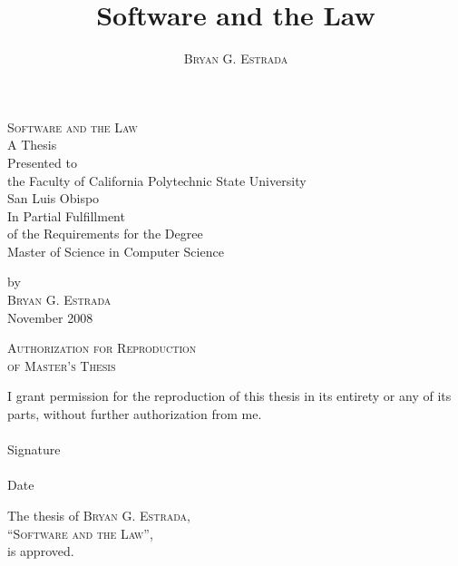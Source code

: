 \documentclass[12pt]{report}
\newcommand{\thetitle}{Software and the Law}
\newcommand{\theauthor}{\textsc{Bryan G. Estrada}}
\newcommand{\theuniversity}{California Polytechnic State University}
\newcommand{\thecity}{San Luis Obispo}
\newcommand{\thedegree}{Master of Science in Computer Science}
\newcommand{\thedate}{November 2008}
\begin{document}
 

\title{\thetitle} 
\author{\theauthor} 

\doublespace 


\begin{titlepage} 
\thispagestyle{empty} 
\begin{center} 

\textsc{\LARGE \thetitle}\\[4cm] 

A Thesis\\ 
Presented to\\ 
the Faculty of \theuniversity\\ 
\thecity\\[4cm] 

In Partial Fulfillment\\ 
of the Requirements for the Degree\\ 
\thedegree 

\vfill 
by\\ 
\theauthor\\ 
\thedate 
\end{center} 

\end{titlepage} 

\begin{center} 
\textsc{\large Authorization for Reproduction\\of Master's Thesis}\\[3cm] 
\end{center} 

\noindent I grant permission for the reproduction of this thesis in its entirety 
or any of its parts, without further authorization from me.\\[4cm] 

\singlespace 
\noindent\makebox[4in]{\hrulefill}\\ 
Signature\\[2cm] 

\noindent\makebox[4in]{\hrulefill}\\ 
Date 
\doublespace 
\newpage 

\begin{center} 
The thesis of \theauthor,\\ 
``\textsc{\large \thetitle}'',\\ 
is approved.\\[4cm] 
\end{center} 
\end{document}
